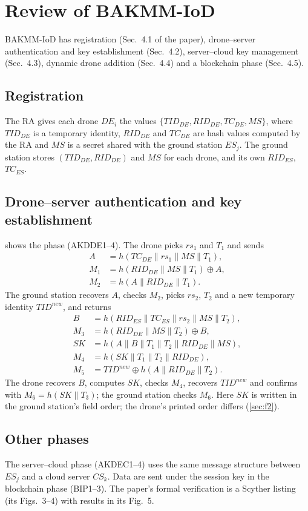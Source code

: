 \section{Review of BAKMM-IoD}\label{sec:review}

BAKMM-IoD \citep{wazid2025} has registration (Sec.~4.1 of the paper), drone--server authentication and key establishment
(Sec.~4.2), server--cloud key management (Sec.~4.3), dynamic drone addition (Sec.~4.4) and a blockchain phase (Sec.~4.5).

\subsection{Registration}
The RA gives each drone $DE_i$ the values $\{TID_{DE},\allowbreak RID_{DE},\allowbreak TC_{DE},\allowbreak MS\}$, where $TID_{DE}$ is a temporary identity,
$RID_{DE}$ and $TC_{DE}$ are hash values computed by the RA and $MS$ is a secret shared with the ground station $ES_j$. The
ground station stores $(TID_{DE}, RID_{DE})$ and $MS$ for each drone, and its own $RID_{ES}$, $TC_{ES}$.

\subsection{Drone--server authentication and key establishment}
 shows the phase (AKDDE1--4). The drone picks $rs_1$ and $T_1$ and sends
\begin{align*}
 A &= h(TC_{DE}\|rs_1\|MS\|T_1),\\
 M_1 &= h(RID_{DE}\|MS\|T_1)\oplus A,\\
 M_2 &= h(A\|RID_{DE}\|T_1).
\end{align*}
The ground station recovers $A$, checks $M_2$, picks $rs_2$, $T_2$ and a new temporary identity $TID^{new}$, and returns
\begin{align*}
 B &= h(RID_{ES}\|TC_{ES}\|rs_2\|MS\|T_2),\\
 M_3 &= h(RID_{DE}\|MS\|T_2)\oplus B,\\
 SK &= h(A\|B\|T_1\|T_2\|RID_{DE}\|MS),\\
 M_4 &= h(SK\|T_1\|T_2\|RID_{DE}),\\
 M_5 &= TID^{new}\oplus h(A\|RID_{DE}\|T_2).
\end{align*}
The drone recovers $B$, computes $SK$, checks $M_4$, recovers $TID^{new}$ and confirms with $M_6 = h(SK\|T_3)$; the ground
station checks $M_6$. Here $SK$ is written in the ground station's field order; the drone's printed order differs
(\cref{sec:f2}).


\subsection{Other phases}
The server--cloud phase (AKDEC1--4) uses the same message structure between $ES_j$ and a cloud server $CS_k$. Data are sent
under the session key in the blockchain phase (BIP1--3). The paper's formal verification is a Scyther listing (its Figs.~3--4)
with results in its Fig.~5.
